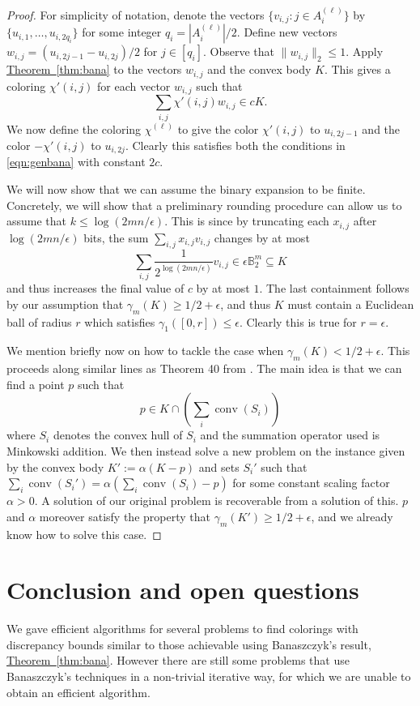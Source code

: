 \documentclass[11pt]{article}
\numberwithin{equation}{section}
\theoremstyle{definition}
\theoremstyle{plain}
\newcommand{\expref}[2]{\hyperref[#2]{#1~\ref{#2}}}
\DeclareMathOperator{\conv}{conv}   %
\begin{document}
\begin{proof}
For simplicity of notation, denote the vectors $\{v_{i,j}: j \in A^{(\ell)}_i\}$ by $\{u_{i,1},\ldots,u_{i,2 q_i}\}$ for some integer $q_i=|A^{(\ell)}_i|/2$. Define new vectors
$w_{i,j} = \left(u_{i,2j-1}-u_{i,2j}\right)/2$ for $j \in [q_i]$.
Observe that $\| w_{i,j}\|_2 \le 1$. Apply \expref{Theorem}{thm:bana} to the vectors $w_{i,j}$ and the convex body $K$. This gives a coloring $\chi'(i,j)$
for each vector $w_{i,j}$ such that
\[ \sum_{i,j} \chi'(i,j) w_{i,j} \in cK.  \]
We now define the coloring $\chi^{(\ell)}$ to give the color $\chi'(i,j)$ to $u_{i,2j-1}$ and the color $-\chi'(i,j)$ to $u_{i,2j}$.
Clearly this satisfies both the conditions in \eqref{eqn:genbana} with constant $2c$.

We will now show that we can assume the binary expansion to be finite. Concretely, we will show that a preliminary rounding procedure
can allow us to assume that $k \le \log(2mn/\epsilon)$. This is since by truncating each $x_{i,j}$ after $\log (2mn/\epsilon)$ bits, the sum $\sum_{i,j} x_{i,j} v_{i,j}$ changes by at most
\[\sum_{i,j} \frac{1}{2^{\log (2mn/\epsilon)}}v_{i,j} \in \epsilon \mathbb{B}_2^m \subseteq K\]
and thus increases the final value of $c$ by at most $1$. The last containment follows by our assumption that $\gamma_m(K)\ge 1/2+\epsilon$, and thus $K$ must contain a Euclidean ball of radius $r$ which satisfies $\gamma_1([0,r]) \le \epsilon$. Clearly this is true for $r=\epsilon$.

We mention briefly now on how to tackle the case when $\gamma_m(K)<1/2+\epsilon$. This proceeds along similar lines as Theorem 40 from \cite{DGLN16}. The main idea is that we can find a point $p$ such that
\[p\in K\cap \left( \sum_{i} \conv(S_i) \right)  \]
where $S_i$ denotes the convex hull of $S_i$ and the summation operator used is Minkowski addition. We then instead solve a new problem on the instance given by 
%
the convex body $K':=\alpha(K-p)$ and sets $S_i'$ such that $\sum_{i} \conv(S_i') =\alpha(\sum_{i} \conv(S_i) -p)$ for some constant scaling factor $\alpha>0$. A solution of our original problem is recoverable from a solution of this. $p$ and $\alpha$ moreover satisfy the property that $\gamma_m(K') \ge 1/2+\epsilon$, and we already know how to solve this case.
\end{proof}






\section{Conclusion and open questions}
We gave efficient algorithms for several problems to find colorings with discrepancy bounds similar to those achievable using  Banaszczyk's result, \expref{Theorem}{thm:bana}. However there are still some problems that use Banaszczyk's techniques in a non-trivial iterative way, for which we are unable to obtain an efficient algorithm.
\end{document}
